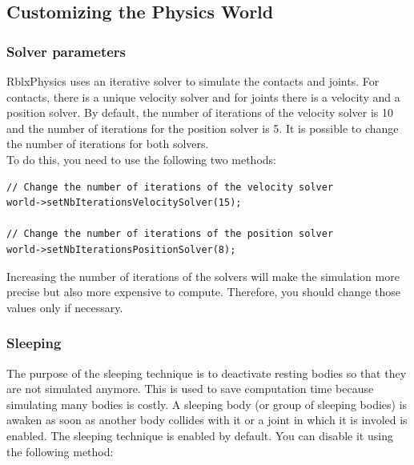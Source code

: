 \documentclass[a4paper,12pt]{article}
\begin{document}
    \subsection{Customizing the Physics World}

    \subsubsection{Solver parameters}

    RblxPhysics uses an iterative solver to simulate the contacts and joints. For contacts, there is a unique velocity solver and for
    joints there is a velocity and a position solver. By default, the number of iterations of the velocity solver is 10 and the number of iterations
    for the position solver is 5. It is possible to change the number of iterations for both solvers. \\

    To do this, you need to use the following two methods: \\

    \begin{lstlisting}
// Change the number of iterations of the velocity solver
world->setNbIterationsVelocitySolver(15);

// Change the number of iterations of the position solver
world->setNbIterationsPositionSolver(8);
  \end{lstlisting}

    \vspace{0.6cm}

    Increasing the number of iterations of the solvers will make the simulation more precise but also more expensive to compute. Therefore, you should change
    those values only if necessary.

    \subsubsection{Sleeping}
    \label{sec:sleeping}

    The purpose of the sleeping technique is to deactivate resting bodies so that they are not simulated anymore. This is used to save computation
    time because simulating many bodies is costly. A sleeping body (or group of sleeping bodies) is awaken as soon as another body collides with it or
    a joint in which it is involed is enabled. The sleeping technique is enabled by default. You can disable it using the following method: \\
\end{document}
